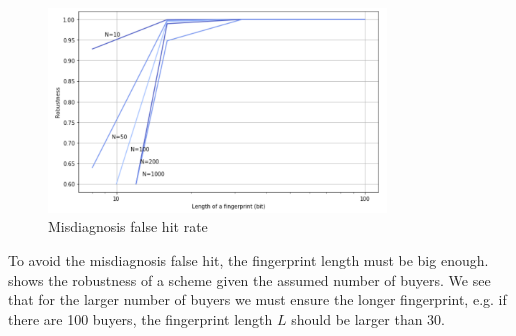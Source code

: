\begin{figure}[ht]{
    \centering
    \includegraphics[width=0.8\textwidth]{Figures/misdiagnosis.PNG}
    \caption{Misdiagnosis false hit rate}
    \label{fig:misdiagnosis}
 }   
 \end{figure}

To avoid the misdiagnosis false hit, the fingerprint length must be big enough.  shows the robustness of a scheme given the assumed number of buyers. We see that for the larger number of buyers we must ensure the longer fingerprint, e.g. if there are 100 buyers, the fingerprint length $L$ should be larger than 30.
 
